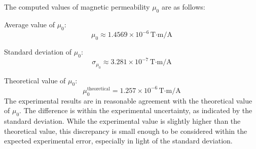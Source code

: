 \documentclass[notitlepage]{report}
\newcounter{theo}[section]\setcounter{theo}{0}
\numberwithin{equation}{section}
\theoremstyle{plain}
\theoremstyle{definition}
\theoremstyle{remark}
\begin{document}
The computed values of magnetic permeability \(\mu_0\) are as follows:

Average value of \(\mu_0\): 
    \[
    \mu_0 \approx 1.4569 \times 10^{-6} \, \text{T·m/A}
    \]
    
Standard deviation of \(\mu_0\): 
    \[
    \sigma_{\mu_0} \approx 3.281 \times 10^{-7} \, \text{T·m/A}
    \]
    
Theoretical value of \(\mu_0\): 
    \[
    \mu_0^{\text{theoretical}} = 1.257 \times 10^{-6} \, \text{T·m/A}
    \]
The experimental results are in reasonable agreement with the theoretical value of \(\mu_0\). The difference is within the experimental uncertainty, as indicated by the standard deviation. While the experimental value is slightly higher than the theoretical value, this discrepancy is small enough to be considered within the expected experimental error, especially in light of the standard deviation. 
\end{document}
